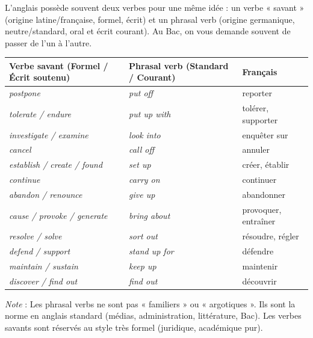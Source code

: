 \documentclass[11pt]{article}
\newcommand{\eng}[1]{\ifmmode\text{\textit{#1}}\else\begingroup\selectlanguage{english}\itshape #1\endgroup\fi}
\begin{document}
\begin{propriete}
L'anglais possède souvent deux verbes pour une même idée : un verbe « savant » (origine latine/française, formel, écrit) et un phrasal verb (origine germanique, neutre/standard, oral et écrit courant). Au Bac, on vous demande souvent de passer de l'un à l'autre.

\begin{center}
\begin{tabularx}{\linewidth}{|X|X|X|}\hline
\rowcolor{popblueL} \textbf{Verbe savant (Formel / Écrit soutenu)} & \textbf{Phrasal verb (Standard / Courant)} & \textbf{Français} \\ \hline
\eng{postpone} & \eng{put off} & reporter \\ \hline
\eng{tolerate / endure} & \eng{put up with} & tolérer, supporter \\ \hline
\eng{investigate / examine} & \eng{look into} & enquêter sur \\ \hline
\eng{cancel} & \eng{call off} & annuler \\ \hline
\eng{establish / create / found} & \eng{set up} & créer, établir \\ \hline
\eng{continue} & \eng{carry on} & continuer \\ \hline
\eng{abandon / renounce} & \eng{give up} & abandonner \\ \hline
\eng{cause / provoke / generate} & \eng{bring about} & provoquer, entraîner \\ \hline
\eng{resolve / solve} & \eng{sort out} & résoudre, régler \\ \hline
\eng{defend / support} & \eng{stand up for} & défendre \\ \hline
\eng{maintain / sustain} & \eng{keep up} & maintenir \\ \hline
\eng{discover / find out} & \eng{find out} & découvrir \\ \hline
\end{tabularx}
\end{center}
\emph{Note} : Les phrasal verbs ne sont pas « familiers » ou « argotiques ». Ils sont la norme en anglais standard (médias, administration, littérature, Bac). Les verbes savants sont réservés au style très formel (juridique, académique pur).
\end{propriete}
\end{document}
